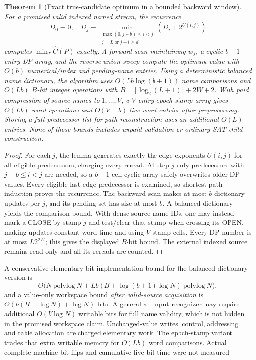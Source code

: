 \documentclass[11pt]{article}
\newtheorem{theorem}{Theorem}
\begin{document}
\begin{theorem}[Exact true-candidate optimum in a bounded backward window]
For a promised valid indexed named stream, the recurrence
\[
D_0=0,\quad
D_j=\min_{\substack{\max(0,j-b)\le i<j\\
j=L\ \mathrm{or}\ j-i\ge d}}
(D_i+2^{U(i,j)})
\]
computes $\min_P\widehat C(P)$ exactly. A forward scan maintaining $w_j$, a cyclic $b+1$-entry DP array, and the reverse union sweep compute the \emph{optimum value} with $O(b)$ numerical/index and pending-name entries. Using a deterministic balanced name dictionary, the algorithm uses $O(Lb\log(b+1))$ name comparisons and $O(Lb)$ $B$-bit integer operations with
$B=\lceil\log_2(L+1)\rceil+2W+2$.
With paid compression of source names to $1,\dots,V$, a $V$-entry epoch-stamp array gives $O(Lb)$ word operations and $O(V+b)$ live word entries after preprocessing. Storing a full predecessor list for path reconstruction uses an \emph{additional} $O(L)$ entries. None of these bounds includes unpaid validation or ordinary SAT child construction.
\end{theorem}
\begin{proof}
For each $j$, the lemma generates exactly the edge exponents $U(i,j)$ for all eligible predecessors, charging every reread. At step $j$ only predecessors with $j-b\le i<j$ are needed, so a $b+1$-cell cyclic array safely overwrites older DP values. Every eligible last-edge predecessor is examined, so shortest-path induction proves the recurrence. The backward scan makes at most $b$ dictionary updates per $j$, and its pending set has size at most $b$. A balanced dictionary yields the comparison bound. With dense source-name IDs, one may instead mark a CLOSE by stamp $j$ and test/clear that stamp when crossing its OPEN, making updates constant-word-time and using $V$ stamp cells. Every DP number is at most $L2^{2W}$; this gives the displayed $B$-bit bound. The external indexed source remains read-only and all its rereads are counted.
\end{proof}
A conservative elementary-bit implementation bound for the balanced-dictionary version is
\[
O\bigl(N\operatorname{polylog}N+
Lb(B+\log(b+1)\log N)\operatorname{polylog}N\bigr),
\]
and a value-only workspace bound \emph{after valid-source acquisition} is
$O(b(B+\log N)+\log N)$ bits. A general all-input recognizer may require additional $O(V\log N)$ writable bits for full name validity, which is not hidden in the promised workspace claim. Unchanged-value writes, control, addressing and table allocation are charged elementary work. The epoch-stamp variant trades that extra writable memory for $O(Lb)$ word comparisons. Actual complete-machine bit flips and cumulative live-bit-time were not measured.
\end{document}
